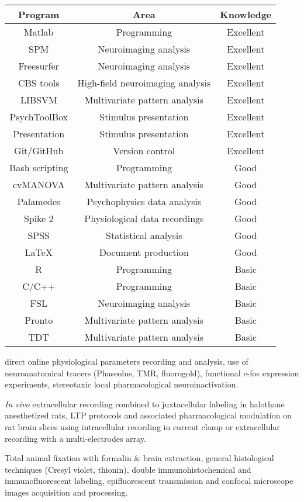 \begin{center}
\begin{tabular}[c]{|c|c|c|}
\hline\hline
Program         & Area                              & Knowledge \\
\hline
Matlab          & Programming                       & Excellent \\ 
SPM             & Neuroimaging analysis             & Excellent \\
Freesurfer      & Neuroimaging analysis             & Excellent \\
CBS tools       & High-field neuroimaging analysis  & Excellent \\
LIBSVM          & Multivariate pattern analysis     & Excellent \\
PsychToolBox    & Stimulus presentation             & Excellent \\
Presentation    & Stimulus presentation             & Excellent \\
Git/GitHub      & Version control                   & Excellent \\
Bash scripting  & Programming                       & Good \\
cvMANOVA        & Multivariate pattern analysis     & Good \\
Palamedes       & Psychophysics data analysis       & Good \\
Spike 2         & Physiological data recordings     & Good \\
SPSS            & Statistical analysis              & Good \\
\LaTeX          & Document production               & Good \\
R               & Programming                       & Basic \\
C/C++           & Programming                       & Basic \\
FSL             & Neuroimaging analysis             & Basic \\
Pronto          & Multivariate pattern analysis     & Basic \\
TDT             & Multivariate pattern analysis     & Basic \\
\hline\hline
\end{tabular} 
\end{center}

 direct online physiological parameters recording and analysis, use of neuroanatomical tracers (Phaseolus, TMR, fluorogold), functional c-fos expression experiments, stereotaxic local pharmacological neuroinactivation. 

 \textit{In vivo} extracellular recording combined to juxtacellular labeling in halothane anesthetized rats, LTP protocols and associated pharmacological modulation on rat brain slices using intracellular recording in current clamp or extracellular recording with a multi-electrodes array. 

 Total animal fixation with formalin \& brain extraction, general histological techniques (Cresyl violet, thionin), double immunohistochemical and immunofluorescent labeling, epifluorescent transmission and confocal microscope images acquisition and processing.
